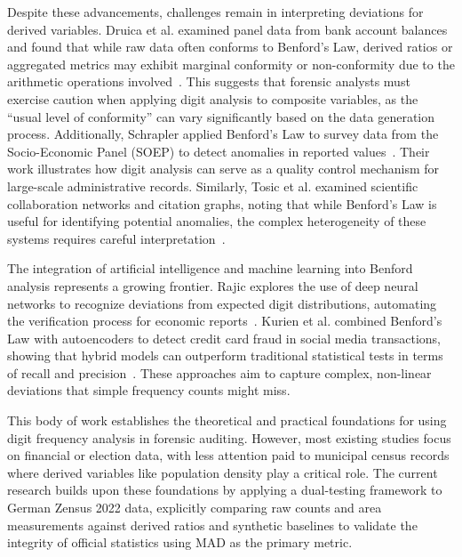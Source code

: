\documentclass[11pt,a4paper]{article}
\begin{document}
Despite these advancements, challenges remain in interpreting deviations for derived variables. Druica et al. examined panel data from bank account balances and found that while raw data often conforms to Benford's Law, derived ratios or aggregated metrics may exhibit marginal conformity or non-conformity due to the arithmetic operations involved~\cite{Druica2018BenfordsLA}. This suggests that forensic analysts must exercise caution when applying digit analysis to composite variables, as the ``usual level of conformity'' can vary significantly based on the data generation process. Additionally, Schrapler applied Benford's Law to survey data from the Socio-Economic Panel (SOEP) to detect anomalies in reported values~\cite{Schrapler2010BenfordsLA}. Their work illustrates how digit analysis can serve as a quality control mechanism for large-scale administrative records. Similarly, Tosic et al. examined scientific collaboration networks and citation graphs, noting that while Benford's Law is useful for identifying potential anomalies, the complex heterogeneity of these systems requires careful interpretation~\cite{Tosic2021UseOB}.

The integration of artificial intelligence and machine learning into Benford analysis represents a growing frontier. Rajic explores the use of deep neural networks to recognize deviations from expected digit distributions, automating the verification process for economic reports~\cite{Rajic2025USINGAT}. Kurien et al. combined Benford's Law with autoencoders to detect credit card fraud in social media transactions, showing that hybrid models can outperform traditional statistical tests in terms of recall and precision~\cite{Kurien2019BenfordsLA}. These approaches aim to capture complex, non-linear deviations that simple frequency counts might miss.

This body of work establishes the theoretical and practical foundations for using digit frequency analysis in forensic auditing. However, most existing studies focus on financial or election data, with less attention paid to municipal census records where derived variables like population density play a critical role. The current research builds upon these foundations by applying a dual-testing framework to German Zensus 2022 data, explicitly comparing raw counts and area measurements against derived ratios and synthetic baselines to validate the integrity of official statistics using MAD as the primary metric.
\end{document}
